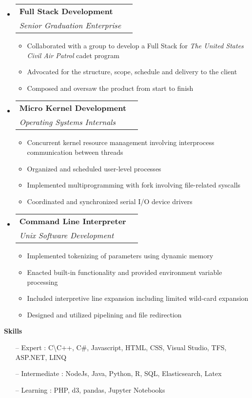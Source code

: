 \documentclass[letterpaper,11pt]{article}
\makeatletter
\newcommand{\resitem}[1]{\item #1 \vspace{-2pt}}
\newcommand{\resheading}[1]{{\large \colorbox{mygrey}{\begin{minipage}{\textwidth}{\textbf{#1 \vphantom{p\^{E}}}}\end{minipage}}}}
\newcommand{\ressubheading}[4]{
\begin{tabular*}{7.0in}{l@{\extracolsep{\fill}}r}
		\textbf{#1} & #2 \\
		\textit{#3} & \textit{#4} \\
\end{tabular*}\vspace{-6pt}}
\makeatother
\begin{document}
\begin{itemize}
\item
	\ressubheading{Full Stack Development}{}{Senior Graduation Enterprise}{}
	\begin{itemize}
		\resitem{Collaborated with a group to develop a Full Stack for \emph{The United States Civil Air Patrol} cadet program}
		\resitem{Advocated for the structure, scope, schedule and delivery to the client}
		\resitem{Composed and oversaw the product from start to finish}
	\end{itemize}
\item
	\ressubheading{Micro Kernel Development}{}{Operating Systems Internals}{}
	\begin{itemize}
		\resitem{Concurrent kernel resource management involving interprocess communication between threads}
		\resitem{Organized and scheduled user-level processes}
		\resitem{Implemented multiprogramming with fork involving file-related syscalls}
		\resitem{Coordinated and synchronized serial I/O device drivers}
	\end{itemize}
\item
	\ressubheading{Command Line Interpreter}{}{Unix Software Development}{}
	\begin{itemize}
		\resitem{Implemented tokenizing of parameters using dynamic memory}
		\resitem{Enacted built-in functionality and provided environment variable processing}
		\resitem{Included interpretive line expansion including limited wild-card expansion}
		\resitem{Designed and utilized pipelining and file redirection}
	\end{itemize}
\end{itemize}
\resheading{Skills}
\begin{itemize}
\item[--] Expert : C\textbackslash C++, C\#, Javascript, HTML, CSS, Visual Studio, TFS, ASP.NET, LINQ\\
\item[--] Intermediate : NodeJs, Java, Python, R, SQL, Elasticsearch, Latex\\
\item[--] Learning : PHP, d3, pandas, Jupyter Notebooks 
\end{itemize}
\end{document}
